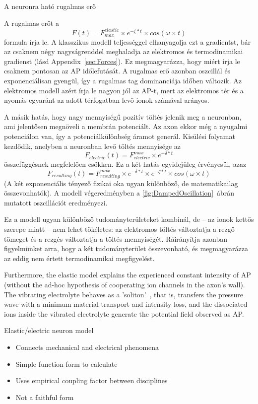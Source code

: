 {A neuronra ható rugalmas erő}
{
A rugalmas erőt a
\[
F(t) = F_{max}^{elastic}\times e^{-\zeta*t}\times cos(\omega\times t)
\]
\noindent 
formula írja le. A klasszikus modell teljességgel elhanyagolja ezt a gradientst, bár az csaknem négy nagyságrenddel meghaladja az elektromos és termodinamikai gradienst (lásd Appendix~\ref{sec:Forces}). Ez megmagyarázza, hogy miért írja le
csaknem pontosan az \gls{AP} időlefutását.
A rugalmas erő azonban oszcillál és exponenciálisan gyengül,
így a rugalmas tag dominanciája időben változik.
Az elektromos modell azért írja le nagyon jól az \gls{AP}-t,
mert az elektromos tér és a nyomás egyaránt az adott térfogatban
levő ionok számával arányos.

A másik hatás, hogy nagy mennyiségű pozitív töltés jelenik meg
a neuronban, ami jelentősen megnöveli a membrán potenciált.
Az axon ekkor még a nyugalmi potenciálon van, 
így a potenciálkülönbség áramot generál.
Kisülési folyamat kezdődik, anelyben a neuronban levő
töltés mennyisége az
\[
F_{electric}(t) = F^{max}_{electric}\times e^{-\delta*t}
\]
\noindent
összefüggésnek megfelelően csökken. Ez a két hatás
egyidejűleg érvényesül, azaz
\[
F_{resulting}(t) = F^{max}_{resulting}\times e^{-\delta*t}  \times e^{-\zeta*t}  \times cos(\omega\times t)
\]
(A két exponenciális tényező fizikai oka ugyan különböző,
de matematikailag összevonhatók).
A modell végeredményben a \ref{fig:DampedOscillation}~ábrán
mutatott oszcillációt eredményezi.

Ez a modell ugyan különböző tudományterületeket kombinál,
de -- az ionok kettős szerepe miatt -- nem lehet tökéletes:
az elektromos töltés változtatja a rezgő tömeget és
a rezgés változtatja a töltés mennyiségét.
Ráirányítja azonban figyelmünket arra, hogy a két 
tudományterület összevonható, és megmagyarázza az eddig
nem értett termodinamikai megfigyelést.
}

\fi


Furthermore, the  elastic model explains the experienced constant intensity
of \gls{AP} (without the ad-hoc hypothesis of cooperating
ion channels in the axon's wall). The vibrating electrolyte 
behaves as a 'soliton'~\cite{SolitonPropagation:2005}, that is, transfers the pressure wave with a minimum material transport and intensity loss, and the dissociated ions inside the vibrated electrolyte generate the potential field observed as \gls{AP}.


\proconpanel
{Elastic/electric neuron model}
{
\begin{itemize}[noitemsep]
	\item Connects mechanical and electrical phenomena
	\item Simple function form to calculate
\end{itemize}
}
{
\begin{itemize}[noitemsep]
	\item Uses empirical coupling factor between disciplines
	\item Not a faithful form
\end{itemize}
}
